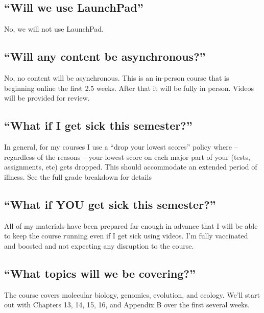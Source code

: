 \documentclass[
]{book}
\begin{document}
\hypertarget{will-we-use-launchpad}{%
\subsection{``Will we use LaunchPad''}\label{will-we-use-launchpad}}

No, we will not use LaunchPad.

\hypertarget{will-any-content-be-asynchronous}{%
\subsection{``Will any content be asynchronous?''}\label{will-any-content-be-asynchronous}}

No, no content will be asynchronous. This is an in-person course that is beginning online the first 2.5 weeks. After that it will be fully in person. Videos will be provided for review.

\hypertarget{what-if-i-get-sick-this-semester}{%
\subsection{``What if I get sick this semester?''}\label{what-if-i-get-sick-this-semester}}

In general, for my courses I use a ``drop your lowest scores'' policy where -- regardless of the reasons -- your lowest score on each major part of your (tests, assignments, etc) gets dropped. This should accommodate an extended period of illness. See the full grade breakdown for details

\hypertarget{what-if-you-get-sick-this-semester}{%
\subsection{``What if YOU get sick this semester?''}\label{what-if-you-get-sick-this-semester}}

All of my materials have been prepared far enough in advance that I will be able to keep the course running even if I get sick using videos. I'm fully vaccinated and boosted and not expecting any disruption to the course.

\hypertarget{what-topics-will-we-be-covering}{%
\subsection{``What topics will we be covering?''}\label{what-topics-will-we-be-covering}}

The course covers molecular biology, genomics, evolution, and ecology. We'll start out with Chapters 13, 14, 15, 16, and Appendix B over the first several weeks.
\end{document}
